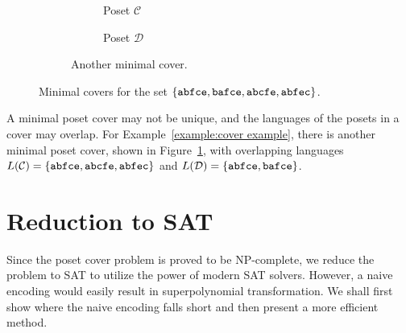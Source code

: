 \documentclass[12pt]{llncs}
\DeclarePairedDelimiter{\set}{\{}{\}}
\newcommand{\poset}[1]{\mathcal{#1}}
\newcommand{\lang}[1]{L(#1)}
\newcommand{\lin}[1]{\texttt{#1}}
\begin{document}
\begin{figure}
\begin{subfigure}[b]{0.5\textwidth}
\begin{subfigure}[b]{0.4\textwidth}
            \caption*{Poset $\poset{C}$}
        \end{subfigure}%
        \begin{subfigure}[b]{0.4\textwidth}
            \centering
            \caption*{Poset $\poset{D}$}
        \end{subfigure}
        \caption{Another minimal cover.}
        \label{figure:cover example c'}
    \end{subfigure}
    \caption{Minimal covers for the set $\set{\lin{abfce},\lin{bafce},\lin{abcfe},\lin{abfec}}$.}
    \label{figure:cover example}
\end{figure}
\vspace{-15px}

A minimal poset cover may not be unique, and the languages of the posets in a cover may overlap. For Example~\ref{example:cover example}, there is another minimal poset cover, shown in Figure~\ref{figure:cover example c'}, with overlapping languages ${\lang{\poset{C}} = \set{\lin{abfce},\lin{abcfe},\lin{abfec}}}$ and ${\lang{\poset{D}} = \set{\lin{abfce},\lin{bafce}}}$.

\section{Reduction to SAT}
Since the poset cover problem is proved to be NP-complete, we  reduce the problem to SAT to utilize the power of modern SAT solvers. However, a naive encoding would easily result in superpolynomial transformation. We shall first show where the naive encoding falls short and then present a more efficient method.
\end{document}
